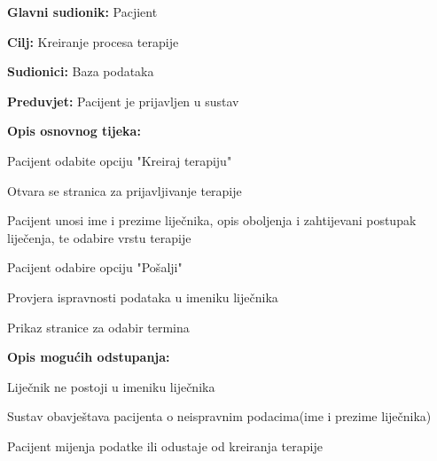 				\noindent {}
				\begin{packed_item}
					
					\item \textbf{Glavni sudionik: }Pacjient
					\item  \textbf{Cilj: }Kreiranje procesa terapije
					\item  \textbf{Sudionici: }Baza podataka
					\item  \textbf{Preduvjet: }Pacijent je prijavljen u sustav
					\item  \textbf{Opis osnovnog tijeka: }
					
					\item[] \begin{packed_enum}
						
						\item Pacijent odabite opciju "Kreiraj terapiju"
						\item Otvara se stranica za prijavljivanje terapije
						\item Pacijent unosi ime i prezime liječnika, opis oboljenja i zahtijevani postupak liječenja, te odabire vrstu terapije
						\item Pacijent odabire opciju "Pošalji"
						\item Provjera ispravnosti podataka u imeniku liječnika
						\item Prikaz stranice za odabir termina
					\end{packed_enum}
					
					\item  \textbf{Opis mogućih odstupanja:}
					
					\item[] \begin{packed_item}
						
						\item[3.a] Liječnik ne postoji u imeniku liječnika
						\item[] \begin{packed_enum}
							
							\item Sustav obavještava pacijenta o neispravnim podacima(ime i prezime liječnika)
							\item Pacijent mijenja podatke ili odustaje od kreiranja terapije
							
						\end{packed_enum}
												
					\end{packed_item}
				\end{packed_item}
